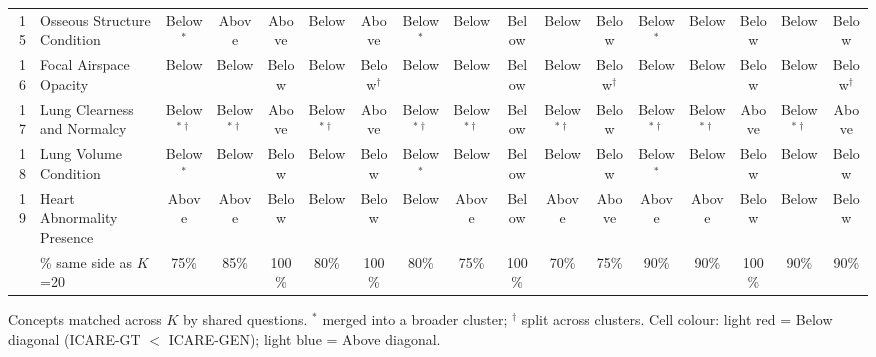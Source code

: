 \begin{landscape}
\begin{table}[p]
\begin{tabular}{rlccccccccccccccc}
15 & Osseous Structure Condition & \cellcolor{red!15}Below$^{\ast}$ & \cellcolor{blue!15}Above & \cellcolor{blue!15}Above & \cellcolor{red!15}Below & \cellcolor{blue!15}Above & \cellcolor{red!15}Below$^{\ast}$ & \cellcolor{red!15}Below & \cellcolor{red!15}Below & \cellcolor{red!15}Below & \cellcolor{red!15}Below & \cellcolor{red!15}Below$^{\ast}$ & \cellcolor{red!15}Below & \cellcolor{red!15}Below & \cellcolor{red!15}Below & \cellcolor{red!15}Below \\
16 & Focal Airspace Opacity & \cellcolor{red!15}Below & \cellcolor{red!15}Below & \cellcolor{red!15}Below & \cellcolor{red!15}Below & \cellcolor{red!15}Below$^{\dagger}$ & \cellcolor{red!15}Below & \cellcolor{red!15}Below & \cellcolor{red!15}Below & \cellcolor{red!15}Below & \cellcolor{red!15}Below$^{\dagger}$ & \cellcolor{red!15}Below & \cellcolor{red!15}Below & \cellcolor{red!15}Below & \cellcolor{red!15}Below & \cellcolor{red!15}Below$^{\dagger}$ \\
17 & Lung Clearness and Normalcy & \cellcolor{red!15}Below$^{\ast\dagger}$ & \cellcolor{red!15}Below$^{\ast\dagger}$ & \cellcolor{blue!15}Above & \cellcolor{red!15}Below$^{\ast\dagger}$ & \cellcolor{blue!15}Above & \cellcolor{red!15}Below$^{\ast\dagger}$ & \cellcolor{red!15}Below$^{\ast\dagger}$ & \cellcolor{red!15}Below & \cellcolor{red!15}Below$^{\ast\dagger}$ & \cellcolor{red!15}Below & \cellcolor{red!15}Below$^{\ast\dagger}$ & \cellcolor{red!15}Below$^{\ast\dagger}$ & \cellcolor{blue!15}Above & \cellcolor{red!15}Below$^{\ast\dagger}$ & \cellcolor{blue!15}Above \\
18 & Lung Volume Condition & \cellcolor{red!15}Below$^{\ast}$ & \cellcolor{red!15}Below & \cellcolor{red!15}Below & \cellcolor{red!15}Below & \cellcolor{red!15}Below & \cellcolor{red!15}Below$^{\ast}$ & \cellcolor{red!15}Below & \cellcolor{red!15}Below & \cellcolor{red!15}Below & \cellcolor{red!15}Below & \cellcolor{red!15}Below$^{\ast}$ & \cellcolor{red!15}Below & \cellcolor{red!15}Below & \cellcolor{red!15}Below & \cellcolor{red!15}Below \\
19 & Heart Abnormality Presence & \cellcolor{blue!15}Above & \cellcolor{blue!15}Above & \cellcolor{red!15}Below & \cellcolor{red!15}Below & \cellcolor{red!15}Below & \cellcolor{red!15}Below & \cellcolor{blue!15}Above & \cellcolor{red!15}Below & \cellcolor{blue!15}Above & \cellcolor{blue!15}Above & \cellcolor{blue!15}Above & \cellcolor{blue!15}Above & \cellcolor{red!15}Below & \cellcolor{red!15}Below & \cellcolor{red!15}Below \\
\midrule
 & \% same side as $K$=20 & 75\% & 85\% & 100\% & 80\% & 100\% & 80\% & 75\% & 100\% & 70\% & 75\% & 90\% & 90\% & 100\% & 90\% & 90\% \\
\bottomrule
\end{tabular}
\begin{flushleft}\footnotesize Concepts matched across $K$ by shared questions. $^\ast$ merged into a broader cluster; $^\dagger$ split across clusters. Cell colour: light red = Below diagonal (ICARE-GT $<$ ICARE-GEN); light blue = Above diagonal.\end{flushleft}
\end{table}
\end{landscape}
